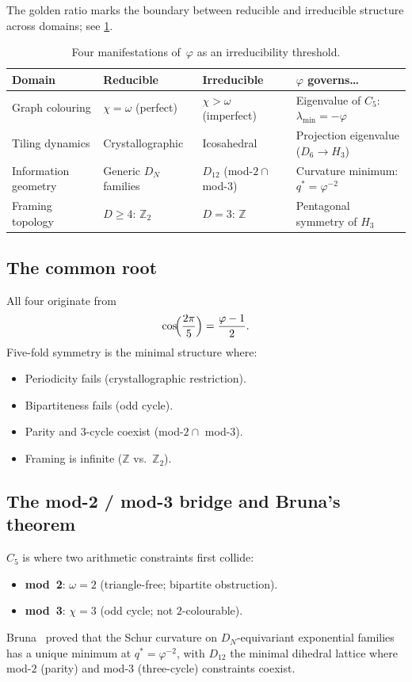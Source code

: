 \documentclass[11pt,a4paper]{amsart}
\theoremstyle{plain}
\theoremstyle{definition}
\theoremstyle{remark}
\newcommand{\Z}{\mathbb{Z}}
\newcommand{\vp}{\varphi}
\newcommand{\chr}{\chi}
\newcommand{\om}{\omega}
\begin{document}
The golden ratio marks the boundary between reducible and irreducible structure
across domains; see \cref{tab:four}.

\begin{table}[ht]
\centering
\caption{Four manifestations of~$\vp$ as an irreducibility threshold.}
\label{tab:four}
\begin{tabular}{@{}p{2.8cm}p{3cm}p{3cm}p{4.2cm}@{}}
\toprule
Domain & Reducible & Irreducible & $\vp$ governs\ldots \\
\midrule
Graph colouring & $\chr = \om$ (perfect) & $\chr > \om$ (imperfect) &
  Eigenvalue of $C_5$: $\lambda_{\min} = -\vp$ \\
Tiling dynamics & Crystallographic & Icosahedral &
  Projection eigenvalue ($D_6 \to H_3$) \\
Information geometry & Generic $D_N$ families & $D_{12}$ (mod-$2 \cap$ mod-$3$) &
  Curvature minimum: $q^* = \vp^{-2}$ \\
Framing topology & $D \geq 4$: $\Z_2$ & $D = 3$: $\Z$ &
  Pentagonal symmetry of $H_3$ \\
\bottomrule
\end{tabular}
\end{table}

\subsection{The common root}

All four originate from
\[
  \cos\!\Bigl(\frac{2\pi}{5}\Bigr) = \frac{\vp - 1}{2}.
\]
Five-fold symmetry is the minimal structure where:
\begin{itemize}
\item Periodicity fails (crystallographic restriction).
\item Bipartiteness fails (odd cycle).
\item Parity and $3$-cycle coexist (mod-$2 \cap$ mod-$3$).
\item Framing is infinite ($\Z$ vs.\ $\Z_2$).
\end{itemize}

\subsection{The mod-2 / mod-3 bridge and Bruna's theorem}\label{ssec:bruna}

$C_5$ is where two arithmetic constraints first collide:
\begin{itemize}
\item \textbf{mod~2}: $\om = 2$ (triangle-free; bipartite obstruction).
\item \textbf{mod~3}: $\chr = 3$ (odd cycle; not $2$-colourable).
\end{itemize}
Bruna~\cite{bruna2025} proved that the Schur curvature on
$D_N$-equivariant exponential families has a unique minimum at
$q^* = \vp^{-2}$, with $D_{12}$ the minimal dihedral lattice where mod-$2$
(parity) and mod-$3$ (three-cycle) constraints coexist.
\end{document}
